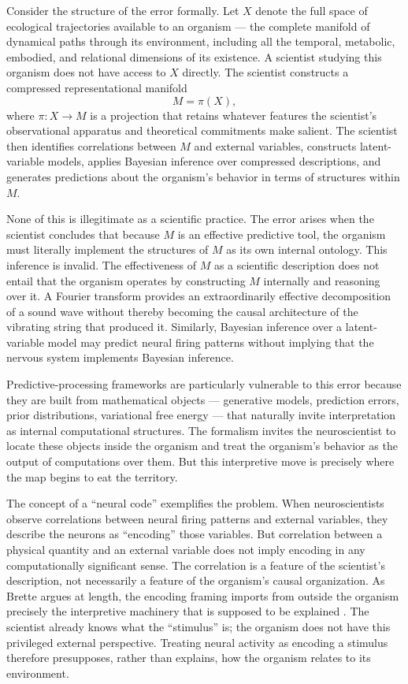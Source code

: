 \documentclass[12pt,a4paper]{report}
\theoremstyle{flyxion}
\begin{document}
Consider the structure of the error formally. Let $X$ denote the full space of ecological trajectories available to an organism --- the complete manifold of dynamical paths through its environment, including all the temporal, metabolic, embodied, and relational dimensions of its existence. A scientist studying this organism does not have access to $X$ directly. The scientist constructs a compressed representational manifold
\[
M = \pi(X),
\]
where $\pi : X \rightarrow M$ is a projection that retains whatever features the scientist's observational apparatus and theoretical commitments make salient. The scientist then identifies correlations between $M$ and external variables, constructs latent-variable models, applies Bayesian inference over compressed descriptions, and generates predictions about the organism's behavior in terms of structures within $M$.

None of this is illegitimate as a scientific practice. The error arises when the scientist concludes that because $M$ is an effective predictive tool, the organism must literally implement the structures of $M$ as its own internal ontology. This inference is invalid. The effectiveness of $M$ as a scientific description does not entail that the organism operates by constructing $M$ internally and reasoning over it. A Fourier transform provides an extraordinarily effective decomposition of a sound wave without thereby becoming the causal architecture of the vibrating string that produced it. Similarly, Bayesian inference over a latent-variable model may predict neural firing patterns without implying that the nervous system implements Bayesian inference.

Predictive-processing frameworks are particularly vulnerable to this error because they are built from mathematical objects --- generative models, prediction errors, prior distributions, variational free energy --- that naturally invite interpretation as internal computational structures. The formalism invites the neuroscientist to locate these objects inside the organism and treat the organism's behavior as the output of computations over them. But this interpretive move is precisely where the map begins to eat the territory.

The concept of a ``neural code'' exemplifies the problem. When neuroscientists observe correlations between neural firing patterns and external variables, they describe the neurons as ``encoding'' those variables. But correlation between a physical quantity and an external variable does not imply encoding in any computationally significant sense. The correlation is a feature of the scientist's description, not necessarily a feature of the organism's causal organization. As Brette argues at length, the encoding framing imports from outside the organism precisely the interpretive machinery that is supposed to be explained \cite{brette2026}. The scientist already knows what the ``stimulus'' is; the organism does not have this privileged external perspective. Treating neural activity as encoding a stimulus therefore presupposes, rather than explains, how the organism relates to its environment.
\end{document}
